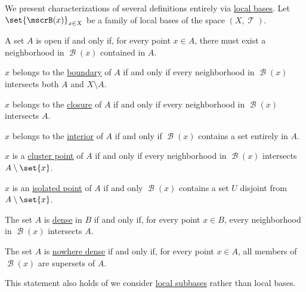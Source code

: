 \begin{proposition}\label{thm:properties_via_bases}
  We present characterizations of several definitions entirely via \hyperref[def:topological_local_base]{local bases}. Let \( \set{ \mscrB(x) }_{x \in X} \) be a family of local bases of the space \( (X, \mscrT) \).

  \begin{thmenum}
     A set \( A \) is open if and only if, for every point \( x \in A \), there must exist a neighborhood in \( \mscrB(x) \) contained in \( A \).

     \( x \) belongs to the \hyperref[def:topological_boundary_operator]{boundary} of \( A \) if and only if every neighborhood in \( \mscrB(x) \) intersects both \( A \) and \( X \setminus A \).

     \( x \) belongs to the \hyperref[def:topological_closure_operator]{closure} of \( A \) if and only if every neighborhood in \( \mscrB(x) \) intersects \( A \).

     \( x \) belongs to the \hyperref[def:topological_interior_operator]{interior} of \( A \) if and only if \( \mscrB(x) \) contains a set entirely in \( A \).

     \( x \) is a \hyperref[def:set_cluster_point]{cluster point} of \( A \) if and only if every neighborhood in \( \mscrB(x) \) intersects \( A \setminus \set{ x } \).

     \( x \) is an \hyperref[def:set_cluster_point]{isolated point} of \( A \) if and only \( \mscrB(x) \) contains a set \( U \) disjoint from \( A \setminus \set{ x } \).

     The set \( A \) is \hyperref[def:topologically_dense_set]{dense} in \( B \) if and only if, for every point \( x \in B \), every neighborhood in \( \mscrB(x) \) intersects \( A \).

     The set \( A \) is \hyperref[def:topologically_dense_set]{nowhere dense} if and only if, for every point \( x \in A \), all members of \( \mscrB(x) \) are supersets of \( A \).

    This statement also holds of we consider \hyperref[def:topological_local_subbase]{local subbases} rather than local bases.
  \end{thmenum}
\end{proposition}
